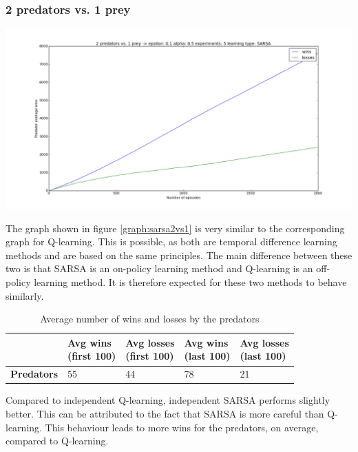 \subsubsection{2 predators vs. 1 prey}
\begin{center}
	\includegraphics[scale=0.3]{2_predators_SARSA}
	\label{graph:sarsa2vs1}
\end{center}

The graph shown in figure \ref{graph:sarsa2vs1} is very similar to the corresponding graph for Q-learning. This is possible, as both are temporal difference learning methods and are based on the same principles. The main difference between these two is that SARSA is an on-policy learning method and Q-learning is an off-policy learning method. It is therefore expected for these two methods to behave similarly.

\begin{table}[H]
\begin{center}
\begin{tabular}{| l | l | l | l | l |}
\hline
 & \parbox{2cm}{\textbf{Avg wins \\ (first 100)}} & \parbox{2cm}{\textbf{Avg losses \\ (first 100)}} & \parbox{2cm}{\textbf{Avg wins \\ (last 100)}} & \parbox{2cm}{\textbf{Avg losses \\ (last 100)}} \\
\hline
\textbf{Predators} & 55 & 44 & 78 & 21 \\
\hline
\end{tabular}
\caption{Average number of wins and losses by the predators}
\end{center}
\end{table}

Compared to independent Q-learning, independent SARSA performs slightly better. This can be attributed to the fact that SARSA is more careful than Q-learning. This behaviour leads to more wins for the predators, on average, compared to Q-learning.

